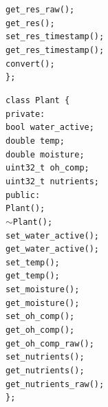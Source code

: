 \begin{flushleft}
\begin{flushleft}
        \quad\quad\texttt{get\_res\_raw();} \\
        \quad\quad\texttt{get\_res();} \\
        \quad\quad\texttt{set\_res\_timestamp();} \\
        \quad\quad\texttt{get\_res\_timestamp();} \\
        \quad\quad\texttt{convert();} \\
        \texttt{\};} \\
    \end{flushleft}
    \begin{flushleft}
        \texttt{class Plant \{}  \\
        \quad\texttt{private:} \\
        \quad\quad\texttt{bool water\_active;} \\
        \quad\quad\texttt{double temp;} \\
        \quad\quad\texttt{double moisture;} \\
        \quad\quad\texttt{uint32\_t oh\_comp;} \\
        \quad\quad\texttt{uint32\_t nutrients;} \\
        \quad\texttt{public:} \\
        \quad\quad\texttt{Plant();} \\
        \quad\quad\texttt{$\sim$Plant();} \\
        \quad\quad\texttt{set\_water\_active();} \\
        \quad\quad\texttt{get\_water\_active();} \\
        \quad\quad\texttt{set\_temp();} \\
        \quad\quad\texttt{get\_temp();} \\
        \quad\quad\texttt{set\_moisture();} \\
        \quad\quad\texttt{get\_moisture();} \\
        \quad\quad\texttt{set\_oh\_comp();} \\
        \quad\quad\texttt{get\_oh\_comp();} \\
        \quad\quad\texttt{get\_oh\_comp\_raw();} \\
        \quad\quad\texttt{set\_nutrients();} \\
        \quad\quad\texttt{get\_nutrients();} \\
        \quad\quad\texttt{get\_nutrients\_raw();} \\
        \texttt{\};} \\
    \end{flushleft}

\end{flushleft}
